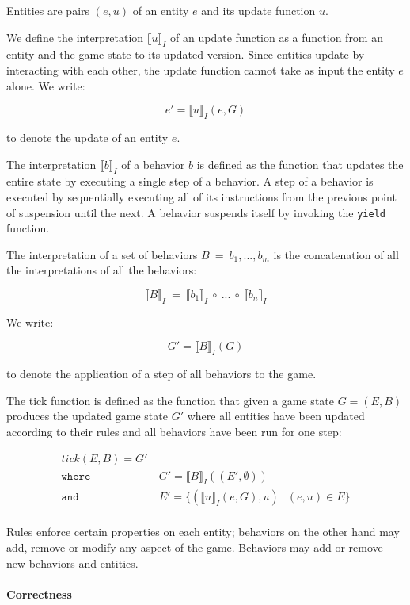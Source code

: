 Entities are pairs $(e,u)$ of an entity $e$ and its update function $u$.

We define the interpretation $\llbracket u \rrbracket_I$ of an update function as a function from an entity and the game state to its updated version. Since entities update by interacting with each other, the update function cannot take as input the entity $e$ alone. We write:

$$ e' = \llbracket u \rrbracket_I(e,G) $$

to denote the update of an entity $e$.

The interpretation $\llbracket b \rrbracket_I$ of a behavior $b$ is defined as the function that updates the entire state by executing a single step of a behavior. A step of a behavior is executed by sequentially executing all of its instructions from the previous point of suspension until the next. A behavior suspends itself by invoking the \texttt{yield} function.

The interpretation of a set of behaviors $B\ =\ {b_1,...,b_m}$ is the concatenation of all the interpretations of all the behaviors:

$$\llbracket B \rrbracket_I\ =\ \llbracket b_1 \rrbracket_I\ \circ\ ...\ \circ\ \llbracket b_n \rrbracket_I$$

We write:

$$ G' = \llbracket B \rrbracket_I(G) $$

to denote the application of a step of all behaviors to the game.

The tick function is defined as the function that given a game state $G=(E,B)$ produces the updated game state $G'$ where all entities have been updated according to their rules and all behaviors have been run for one step:

$$
\begin{array}{lc}
tick(E,B) = G' \\
\mathtt{where} & \ G' = \llbracket B \rrbracket_I((E',\emptyset)) \\
\mathtt{and} & \ E' = \{(\llbracket u \rrbracket_I(e,G),u)\ |\ (e,u) \in E\}\\
\end{array}
$$

Rules enforce certain properties on each entity; behaviors on the other hand may add, remove or modify any aspect of the game. Behaviors may add or remove new behaviors and entities.

\paragraph{Correctness}

